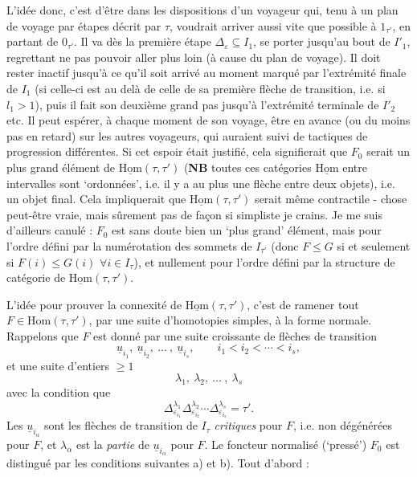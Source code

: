 \documentclass[11pt]{article}
\newcommand{\printedpage}[1]{\marginpar{\footnotesize p.~#1}}
\newcommand{\msp}[1]{\marginpar{\vspace*{10pt}\footnotesize [#1]}}
\newcommand{\uHom}{\underline{\mathrm{Hom}}}
\newcommand{\ul}[1]{\underline{#1}}
\begin{document}
\printedpage{56}

\msp{page 86}
L'idée donc, c'est d'être dans les dispositions d'un voyageur qui, tenu à un plan de voyage par étapes décrit par $\tau$, voudrait arriver aussi vite que possible à $1_{\tau'}$, en partant de $0_{\tau'}$. Il va dès la première étape $\Delta_\varepsilon\subseteq I_1$, se porter jusqu'au bout de $I'_1$, regrettant ne pas pouvoir aller plus loin (à cause du plan de voyage). Il doit rester inactif jusqu'à ce qu'il soit arrivé au moment marqué par l'extrémité finale de $I_1$ (si celle-ci est au delà de celle de sa première flèche de transition, i.e. si $l_1>1$), puis il fait son deuxième grand pas jusqu'à l'extrémité terminale de $I'_2$ etc. Il peut espérer, à chaque moment de son voyage, être en avance (ou du moins pas en retard) sur les autres voyageurs, qui auraient suivi de tactiques de progression différentes. Si cet espoir était justifié, cela signifierait que $F_0$ serait un plus grand élément de $\uHom(\tau,\tau')$ (\textbf{NB} toutes ces catégories $\uHom$ entre intervalles sont ‘ordonnées’, i.e. il y a au plus une flèche entre deux objets), i.e. un objet final. Cela impliquerait que $\uHom(\tau,\tau')$ serait même contractile - chose peut-être vraie, mais sûrement pas de façon si simpliste je crains. Je me suis d'ailleurs canulé : $F_0$ est sans doute bien un ‘plus grand’ élément, mais pour l'ordre défini par la numérotation des sommets de $I_{\tau'}$ (donc $F\leq G$ si et seulement si $F(i)\leq G(i)$ $\forall i\in I_\tau$), et nullement pour l'ordre défini par la structure de catégorie de $\uHom(\tau,\tau')$.

\msp{page 87}
L'idée pour prouver la connexité de $\uHom(\tau,\tau')$, c'est de ramener tout $F\in\mathrm{Hom}(\tau,\tau')$, par une suite d'homotopies simples, à la forme normale. Rappelons que $F$ est donné par une suite croissante de flèches de transition
\[
\ul{u}_{i_1},\ \ul{u}_{i_2},\ \dots\ ,\ \ul{u}_{i_s},\qquad i_1<i_2<\cdots<i_s,
\]
et une suite d'entiers $\geq1$
\[
\lambda_1,\ \lambda_2,\ \dots\ ,\ \lambda_s
\]
avec la condition que
\[
\Delta^{\lambda_1}_{\varepsilon_{i_1}}\Delta^{\lambda_2}_{\varepsilon_{i_2}}\cdots\Delta^{\lambda_s}_{\varepsilon_{i_s}}=\tau'. \tag*{$(*)$}
\]
Les $\ul{u}_{i_\alpha}$ sont les flèches de transition de $I_\tau$ \textit{critiques} pour $F$, i.e. non dégénérées pour $F$, et $\lambda_\alpha$ est la \textit{partie} de $\ul{u}_{i_\alpha}$ pour $F$. Le foncteur normalisé (‘pressé’) $F_0$ est distingué par les conditions suivantes a) et b). Tout d'abord :
\end{document}
